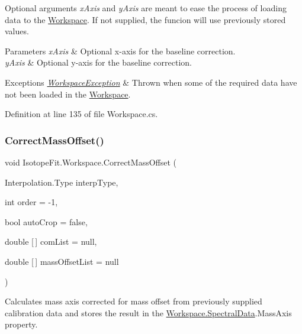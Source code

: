 Optional arguments {\itshape x\+Axis}  and {\itshape y\+Axis}  are meant to ease the process of loading data to the \hyperlink{class_isotope_fit_1_1_workspace}{Workspace}. If not supplied, the funcion will use previously stored values.


\begin{DoxyParams}{Parameters}
{\em x\+Axis} & Optional x-\/axis for the baseline correction.\\
\hline
{\em y\+Axis} & Optional y-\/axis for the baseline correction.\\
\hline
\end{DoxyParams}

\begin{DoxyExceptions}{Exceptions}
{\em \hyperlink{class_isotope_fit_1_1_workspace_exception}{Workspace\+Exception}} & Thrown when some of the required data have not been loaded in the \hyperlink{class_isotope_fit_1_1_workspace}{Workspace}.\\
\hline
\end{DoxyExceptions}


Definition at line 135 of file Workspace.\+cs.

\mbox{\label{class_isotope_fit_1_1_workspace_a188d75c84db3eb6b5c3812e44eb95695}} 
\subsubsection{\texorpdfstring{Correct\+Mass\+Offset()}{CorrectMassOffset()}}
{\footnotesize\ttfamily void Isotope\+Fit.\+Workspace.\+Correct\+Mass\+Offset (\begin{DoxyParamCaption}\item[{Interpolation.\+Type}]{interp\+Type,  }\item[{int}]{order = {\ttfamily -\/1},  }\item[{bool}]{auto\+Crop = {\ttfamily false},  }\item[{double \mbox{[}$\,$\mbox{]}}]{com\+List = {\ttfamily null},  }\item[{double \mbox{[}$\,$\mbox{]}}]{mass\+Offset\+List = {\ttfamily null} }\end{DoxyParamCaption})}



Calculates mass axis corrected for mass offset from previously supplied calibration data and stores the result in the \hyperlink{class_isotope_fit_1_1_workspace_a1d6cc2dd07cbfe920da9f1bffc9b32c2}{Workspace.\+Spectral\+Data}.Mass\+Axis property. 

